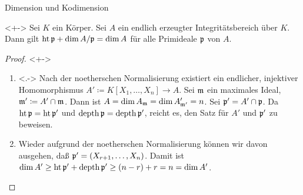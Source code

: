 \begin{frame}{Dimension und Kodimension}
	\begin{theorem}<+->
		Sei \(K\) ein Körper. Sei \(A\) ein endlich erzeugter Integritätsbereich
		über \(K\). Dann gilt \(\operatorname{ht} \mathfrak{p} + \dim A/\mathfrak{p} = \dim A\)
		für alle Primideale \(\mathfrak{p}\) von \(A\).
	\end{theorem}
	\begin{proof}<+->
		\begin{enumerate}[<+->]
		\item<.->
			Nach der noetherschen Normalisierung existiert ein endlicher,
			injektiver Homomorphismus \(A' \coloneqq K[X_1, \dotsc, X_n] \to A\).
			Sei \(\mathfrak{m}\) ein maximales Ideal, \(\mathfrak{m}' \coloneqq A' \cap \mathfrak{m}\). Dann ist \(A = \dim A_{\mathfrak{m}} =
			\dim A'_{\mathfrak{m}'} = n\). Sei \(\mathfrak{p}' = A' \cap \mathfrak{p}\). Da \(\operatorname{ht} \mathfrak{p} = \operatorname{ht} \mathfrak{p}'\)
			und \(\operatorname{depth} \mathfrak{p} = \operatorname{depth} \mathfrak{p}'\), reicht es, den Satz für \(A'\) und \(\mathfrak{p}'\) zu beweisen.
		\item
			Wieder aufgrund der noetherschen Normalisierung können wir davon ausgehen, daß \(\mathfrak{p}' = (X_{r + 1},
			\dotsc, X_n)\). Damit ist
			\(\dim A' \ge \operatorname{ht} \mathfrak{p}' + \operatorname{depth} \mathfrak{p}' \ge (n - r) + r = n = \dim A'\).
			\qedhere
		\end{enumerate}
	\end{proof}
\end{frame}

